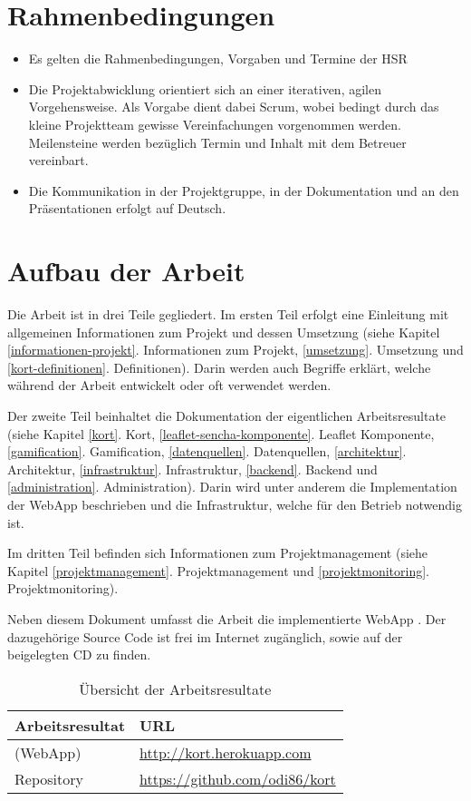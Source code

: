 \section{Rahmenbedingungen}
\begin{itemize}
\item Es gelten die Rahmenbedingungen, Vorgaben und Termine der HSR
\item Die Projektabwicklung orientiert sich an einer iterativen, agilen Vorgehensweise. Als Vorgabe dient dabei Scrum, wobei bedingt durch das kleine Projektteam gewisse Vereinfachungen vorgenommen werden. Meilensteine werden bezüglich Termin und Inhalt mit dem Betreuer vereinbart.
\item Die Kommunikation in der Projektgruppe, in der Dokumentation und an den Präsentationen erfolgt auf Deutsch.
\end{itemize}

\section{Aufbau der Arbeit}
Die Arbeit ist in drei Teile gegliedert. Im ersten Teil erfolgt eine Einleitung mit allgemeinen Informationen zum Projekt und dessen Umsetzung (siehe Kapitel \ref{informationen-projekt}. Informationen zum Projekt, \ref{umsetzung}. Umsetzung und \ref{kort-definitionen}. Definitionen). Darin werden auch Begriffe erklärt, welche während der Arbeit entwickelt oder oft verwendet werden.

Der zweite Teil beinhaltet die Dokumentation der eigentlichen Arbeitsresultate (siehe Kapitel \ref{kort}. Kort, \ref{leaflet-sencha-komponente}. Leaflet Komponente, \ref{gamification}. Gamification, \ref{datenquellen}. Datenquellen, \ref{architektur}. Architektur, \ref{infrastruktur}. Infrastruktur, \ref{backend}. Backend und \ref{administration}. Administration). Darin wird unter anderem die Implementation der \gls{WebApp} beschrieben und die Infrastruktur, welche für den Betrieb notwendig ist.

Im dritten Teil befinden sich Informationen zum Projektmanagement (siehe Kapitel \ref{projektmanagement}. Projektmanagement und \ref{projektmonitoring}. Projektmonitoring).

Neben diesem Dokument umfasst die Arbeit die implementierte \gls{WebApp} \kort{}. Der dazugehörige Source Code ist frei im Internet zugänglich, sowie auf der beigelegten CD zu finden.

\begin{table}[H]
\centering
\begin{tabular}{|p{0.3\twocelltabwidth}|p{0.7\twocelltabwidth}|}
\hline 
\textbf{Arbeitsresultat} & \textbf{URL} \\ 
\hline 
\kort{} (\gls{WebApp}) & \url{http://kort.herokuapp.com} \\ 
\hline 
Repository & \url{https://github.com/odi86/kort} \\ 
\hline 
\end{tabular}
\label{arbeitsresultate}
\caption{Übersicht der Arbeitsresultate}
\end{table} 